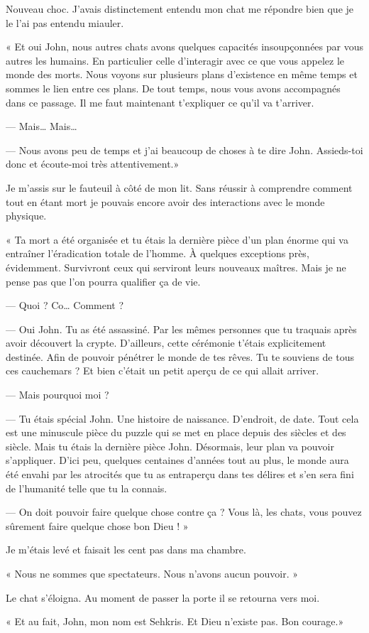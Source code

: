 Nouveau choc. J'avais distinctement entendu mon chat me répondre bien que je le l'ai pas entendu miauler.

« Et oui John, nous autres chats avons quelques capacités insoupçonnées par vous autres les humains. En particulier 
celle d'interagir avec ce que vous appelez le monde des morts. Nous voyons sur plusieurs plans d'existence en même 
temps et sommes le lien entre ces plans. De tout temps, nous vous avons accompagnés dans ce passage. Il me faut 
maintenant t'expliquer ce qu'il va t'arriver.

— Mais… Mais…

— Nous avons peu de temps et j'ai beaucoup de choses à te dire John. Assieds-toi donc et écoute-moi très attentivement.»

Je m'assis sur le fauteuil à côté de mon lit. Sans réussir à comprendre comment tout en étant mort je pouvais encore 
avoir des interactions avec le monde physique.

« Ta mort a été organisée et tu étais la dernière pièce d'un plan énorme qui va entraîner l'éradication totale de 
l'homme. À quelques exceptions près, évidemment. Survivront ceux qui serviront leurs nouveaux maîtres. Mais je ne pense 
pas que l'on pourra qualifier ça de vie.

— Quoi ? Co… Comment ?

— Oui John. Tu as été assassiné. Par les mêmes personnes que tu traquais après avoir découvert la crypte. D'ailleurs, 
cette cérémonie t'étais explicitement destinée. Afin de pouvoir pénétrer le monde de tes rêves. Tu te souviens de tous 
ces cauchemars ? Et bien c'était un petit aperçu de ce qui allait arriver.

— Mais pourquoi moi ?

— Tu étais spécial John. Une histoire de naissance. D'endroit, de date. Tout cela est une minuscule pièce du puzzle qui 
se met en place depuis des siècles et des siècle. Mais tu étais la dernière pièce John. Désormais, leur plan va pouvoir 
s'appliquer. D'ici peu, quelques centaines d'années tout au plus, le monde aura été envahi par les atrocités que tu as 
entraperçu dans tes délires et s'en sera fini de l'humanité telle que tu la connais.

— On doit pouvoir faire quelque chose contre ça ? Vous là, les chats, vous pouvez sûrement faire quelque chose bon Dieu 
! »

Je m'étais levé et faisait les cent pas dans ma chambre.

« Nous ne sommes que spectateurs. Nous n'avons aucun pouvoir. »

Le chat s'éloigna. Au moment de passer la porte il se retourna vers moi.

« Et au fait, John, mon nom est Sehkris. Et Dieu n'existe pas. Bon courage.»